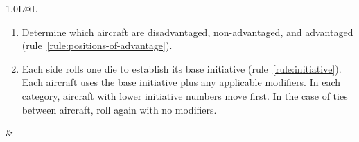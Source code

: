 \begin{twocolumntable}
\begin{tabularx}{1.0\linewidth}{L@{\hspace{\columnsep}}L}
{\begin{enumerate}

\begin{enumerate}[nosep]
    \item Determine which aircraft are disadvantaged, non-advantaged, and advantaged (rule~\ref{rule:positions-of-advantage}).
    \item Each side rolls one die to establish its base initiative (rule~\ref{rule:initiative}). Each aircraft uses the base initiative plus any applicable modifiers. In each category, aircraft with lower initiative numbers move first. In the case of ties between aircraft, roll again with no modifiers.
\end{enumerate}

\end{enumerate}

&

\begin{enumerate}[start=7]



\end{enumerate}}
\end{tabularx}
\end{twocolumntable}
